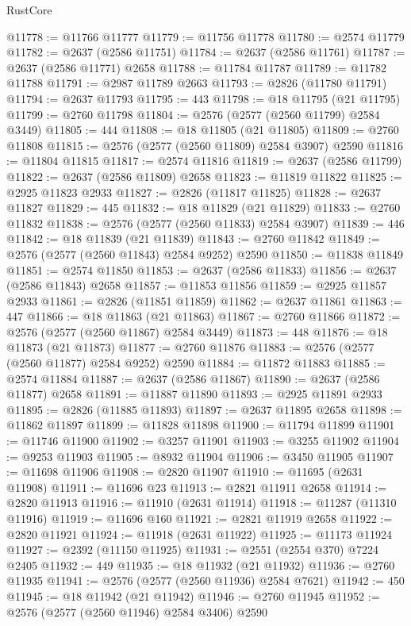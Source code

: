 \begin{lexlean}{RustCore}
\begin{coremodule}
@11778 := @11766 @11777
@11779 := @11756 @11778
@11780 := @2574 @11779
@11782 := @2637 (@2586 @11751)
@11784 := @2637 (@2586 @11761)
@11787 := @2637 (@2586 @11771) @2658
@11788 := @11784 @11787
@11789 := @11782 @11788
@11791 := @2987 @11789 @2663
@11793 := @2826 (@11780 @11791)
@11794 := @2637 @11793
@11795 := 443
@11798 := @18 @11795 (@21 @11795)
@11799 := @2760 @11798
@11804 := @2576 (@2577 (@2560 @11799) @2584 @3449)
@11805 := 444
@11808 := @18 @11805 (@21 @11805)
@11809 := @2760 @11808
@11815 := @2576 (@2577 (@2560 @11809) @2584 @3907) @2590
@11816 := @11804 @11815
@11817 := @2574 @11816
@11819 := @2637 (@2586 @11799)
@11822 := @2637 (@2586 @11809) @2658
@11823 := @11819 @11822
@11825 := @2925 @11823 @2933
@11827 := @2826 (@11817 @11825)
@11828 := @2637 @11827
@11829 := 445
@11832 := @18 @11829 (@21 @11829)
@11833 := @2760 @11832
@11838 := @2576 (@2577 (@2560 @11833) @2584 @3907)
@11839 := 446
@11842 := @18 @11839 (@21 @11839)
@11843 := @2760 @11842
@11849 := @2576 (@2577 (@2560 @11843) @2584 @9252) @2590
@11850 := @11838 @11849
@11851 := @2574 @11850
@11853 := @2637 (@2586 @11833)
@11856 := @2637 (@2586 @11843) @2658
@11857 := @11853 @11856
@11859 := @2925 @11857 @2933
@11861 := @2826 (@11851 @11859)
@11862 := @2637 @11861
@11863 := 447
@11866 := @18 @11863 (@21 @11863)
@11867 := @2760 @11866
@11872 := @2576 (@2577 (@2560 @11867) @2584 @3449)
@11873 := 448
@11876 := @18 @11873 (@21 @11873)
@11877 := @2760 @11876
@11883 := @2576 (@2577 (@2560 @11877) @2584 @9252) @2590
@11884 := @11872 @11883
@11885 := @2574 @11884
@11887 := @2637 (@2586 @11867)
@11890 := @2637 (@2586 @11877) @2658
@11891 := @11887 @11890
@11893 := @2925 @11891 @2933
@11895 := @2826 (@11885 @11893)
@11897 := @2637 @11895 @2658
@11898 := @11862 @11897
@11899 := @11828 @11898
@11900 := @11794 @11899
@11901 := @11746 @11900
@11902 := @3257 @11901
@11903 := @3255 @11902
@11904 := @9253 @11903
@11905 := @8932 @11904
@11906 := @3450 @11905
@11907 := @11698 @11906
@11908 := @2820 @11907
@11910 := @11695 (@2631 @11908)
@11911 := @11696 @23
@11913 := @2821 @11911 @2658
@11914 := @2820 @11913
@11916 := @11910 (@2631 @11914)
@11918 := @11287 (@11310 @11916)
@11919 := @11696 @160
@11921 := @2821 @11919 @2658
@11922 := @2820 @11921
@11924 := @11918 (@2631 @11922)
@11925 := @11173 @11924
@11927 := @2392 (@11150 @11925)
@11931 := @2551 (@2554 @370) @7224 @2405
@11932 := 449
@11935 := @18 @11932 (@21 @11932)
@11936 := @2760 @11935
@11941 := @2576 (@2577 (@2560 @11936) @2584 @7621)
@11942 := 450
@11945 := @18 @11942 (@21 @11942)
@11946 := @2760 @11945
@11952 := @2576 (@2577 (@2560 @11946) @2584 @3406) @2590

\end{coremodule}
\end{lexlean}
